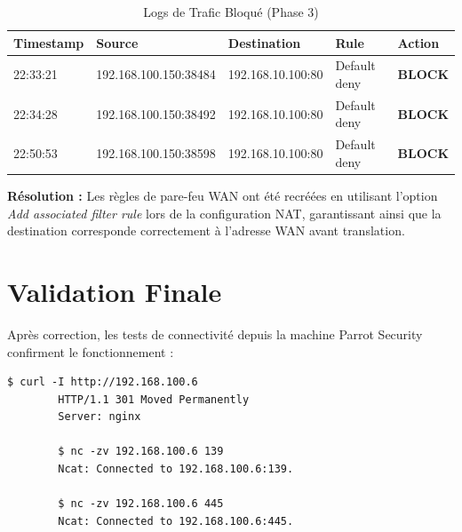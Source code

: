 \documentclass[12pt,a4paper,openany]{report}
\newcommand{\tableheadcolor}{\rowcolor{tableheadbg}}
\begin{document}
	\begin{table}[ht]
		\centering
		\small
		\renewcommand{\arraystretch}{1.4}
		\setlength{\arrayrulewidth}{0.5pt}
		\begin{tabular}{p{2.2cm} p{4.2cm} p{3.4cm} p{3.4cm} >{\centering\arraybackslash}p{1.6cm}}
			\arrayrulecolor{tableborder}
			\hline
			\tableheadcolor
			\textcolor{tableheadfg}{\textbf{Timestamp}} &
			\textcolor{tableheadfg}{\textbf{Source}} &
			\textcolor{tableheadfg}{\textbf{Destination}} &
			\textcolor{tableheadfg}{\textbf{Rule}} &
			\textcolor{tableheadfg}{\textbf{Action}} \\
			\hline
			\rowcolor{tablerowalt}
			22:33:21 & 192.168.100.150:38484 & 192.168.10.100:80 & Default deny & \textcolor{accent}{\textbf{BLOCK}} \\
			22:34:28 & 192.168.100.150:38492 & 192.168.10.100:80 & Default deny & \textcolor{accent}{\textbf{BLOCK}} \\
			\rowcolor{tablerowalt}
			22:50:53 & 192.168.100.150:38598 & 192.168.10.100:80 & Default deny & \textcolor{accent}{\textbf{BLOCK}} \\
			\hline
		\end{tabular}
		\caption{Logs de Trafic Bloqué (Phase 3)}
		\label{tab:logs-deny}
	\end{table}
	
	\textbf{Résolution :} Les règles de pare-feu WAN ont été recréées en utilisant l'option \textit{Add associated filter rule} lors de la configuration NAT, garantissant ainsi que la destination corresponde correctement à l'adresse WAN avant translation.
	
	\section{Validation Finale}
	Après correction, les tests de connectivité depuis la machine Parrot Security confirment le fonctionnement :
	\begin{lstlisting}[caption=Tests de Connectivité depuis l'Attaquant (Parrot)]
		$ curl -I http://192.168.100.6
		HTTP/1.1 301 Moved Permanently
		Server: nginx
		
		$ nc -zv 192.168.100.6 139
		Ncat: Connected to 192.168.100.6:139.
		
		$ nc -zv 192.168.100.6 445
		Ncat: Connected to 192.168.100.6:445.
	\end{lstlisting}
	
\end{document}

